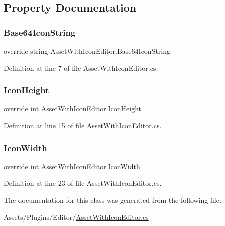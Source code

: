 \subsection{Property Documentation}
\mbox{\label{class_asset_with_icon_editor_aea5c36bd81f9821e486d43aa2569a2eb}} 
\subsubsection{\texorpdfstring{Base64\+Icon\+String}{Base64IconString}}
{\footnotesize\ttfamily override string Asset\+With\+Icon\+Editor.\+Base64\+Icon\+String\hspace{0.3cm}{\ttfamily [get]}}



Definition at line 7 of file Asset\+With\+Icon\+Editor.\+cs.

\mbox{\label{class_asset_with_icon_editor_a9b66213f74bd548cf96e6a1e5cf149cd}} 
\subsubsection{\texorpdfstring{Icon\+Height}{IconHeight}}
{\footnotesize\ttfamily override int Asset\+With\+Icon\+Editor.\+Icon\+Height\hspace{0.3cm}{\ttfamily [get]}}



Definition at line 15 of file Asset\+With\+Icon\+Editor.\+cs.

\mbox{\label{class_asset_with_icon_editor_a4f7bf2614cc56c455424670085c59b33}} 
\subsubsection{\texorpdfstring{Icon\+Width}{IconWidth}}
{\footnotesize\ttfamily override int Asset\+With\+Icon\+Editor.\+Icon\+Width\hspace{0.3cm}{\ttfamily [get]}}



Definition at line 23 of file Asset\+With\+Icon\+Editor.\+cs.



The documentation for this class was generated from the following file\+:\begin{DoxyCompactItemize}
\item 
Assets/\+Plugins/\+Editor/\mbox{\hyperlink{_asset_with_icon_editor_8cs}{Asset\+With\+Icon\+Editor.\+cs}}\end{DoxyCompactItemize}
